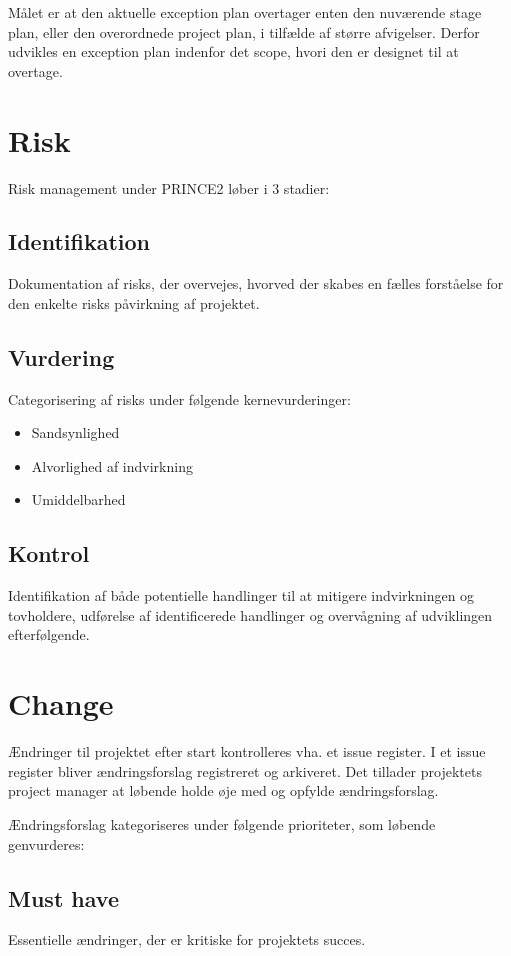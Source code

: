 Målet er at den aktuelle exception plan overtager enten den nuværende stage plan, eller den overordnede project plan, i tilfælde af større afvigelser. Derfor udvikles en exception plan indenfor det scope, hvori den er designet til at overtage.

\section{Risk}
Risk management under PRINCE2 løber i 3 stadier:

\subsection*{Identifikation}
Dokumentation af risks, der overvejes, hvorved der skabes en fælles forståelse for den enkelte risks påvirkning af projektet.

\subsection*{Vurdering}
Categorisering af risks under følgende kernevurderinger:
\begin{itemize}
    \item Sandsynlighed
    \item Alvorlighed af indvirkning
    \item Umiddelbarhed
\end{itemize}

\subsection*{Kontrol}
Identifikation af både potentielle handlinger til at mitigere indvirkningen og tovholdere, udførelse af identificerede handlinger og overvågning af udviklingen efterfølgende.

\section{Change}
Ændringer til projektet efter start kontrolleres vha. et issue register. I et issue register bliver ændringsforslag registreret og arkiveret. Det tillader projektets project manager at løbende holde øje med og opfylde ændringsforslag.

Ændringsforslag kategoriseres under følgende prioriteter, som løbende genvurderes:

\subsection*{Must have}
Essentielle ændringer, der er kritiske for projektets succes.

